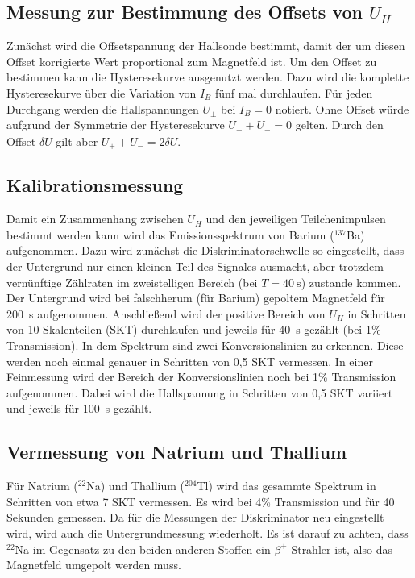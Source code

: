 \subsection{Messung zur Bestimmung des Offsets von $U_H$}
Zunächst wird die Offsetspannung der Hallsonde bestimmt, damit der um diesen Offset korrigierte Wert proportional zum Magnetfeld ist. Um den Offset zu bestimmen kann die Hysteresekurve ausgenutzt werden. Dazu wird die komplette Hysteresekurve über die Variation von $I_B$ fünf mal durchlaufen. Für jeden Durchgang werden die Hallspannungen $U_\pm$ bei $I_B=0$ notiert. Ohne Offset würde aufgrund der Symmetrie der Hysteresekurve $U_++U_-=0$ gelten. Durch den Offset $\delta U$ gilt aber $U_++U_-=2\delta U$. \\

\subsection{Kalibrationsmessung}
Damit ein Zusammenhang zwischen $U_H$ und den jeweiligen Teilchenimpulsen bestimmt werden kann wird das Emissionsspektrum von Barium ($^{137}$Ba) aufgenommen. Dazu wird zunächst die Diskriminatorschwelle so eingestellt, dass der Untergrund nur einen kleinen Teil des Signales ausmacht, aber trotzdem vernünftige Zählraten im zweistelligen Bereich (bei $T=\SI{40}{\second}$) zustande kommen. Der Untergrund wird bei falschherum (für Barium) gepoltem Magnetfeld für \SI{200}{\second} aufgenommen. Anschließend wird der positive Bereich von $U_H$ in Schritten von 10 Skalenteilen (SKT) durchlaufen und jeweils für \SI{40}{\second} gezählt (bei 1\% Transmission). In dem Spektrum sind zwei Konversionslinien zu erkennen. Diese werden noch einmal genauer in Schritten von 0,5 SKT vermessen. In einer Feinmessung wird der Bereich der Konversionslinien noch bei 1\% Transmission aufgenommen. Dabei wird die Hallspannung in Schritten von  0,5 SKT variiert und jeweils für \SI{100}{\second} gezählt.

\subsection{Vermessung von Natrium und Thallium}
Für Natrium ($^{22}$Na) und Thallium ($^{204}$Tl) wird das gesammte Spektrum in Schritten von etwa 7 SKT vermessen. Es wird bei 4\% Transmission und für 40 Sekunden gemessen. Da für die Messungen der Diskriminator neu eingestellt wird, wird auch die Untergrundmessung wiederholt. Es ist darauf zu achten, dass $^{22}$Na im Gegensatz zu den beiden anderen Stoffen ein $\beta^+$-Strahler ist, also das Magnetfeld umgepolt werden muss.
